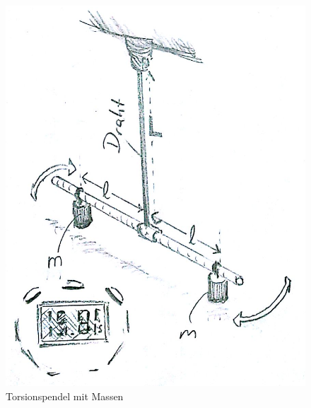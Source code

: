 \documentclass[12pt,a4paper]{article}
\begin{document}
\begin{multicols}{2}
\begin{figure}[H]
	\centering
  	\includegraphics[scale=0.25]{./figure/torsionspendel_aufbau.png}
	\caption{Torsionspendel mit Massen}
	\label{fig:torsion}
\end{figure}


\end{multicols}
\end{document}

